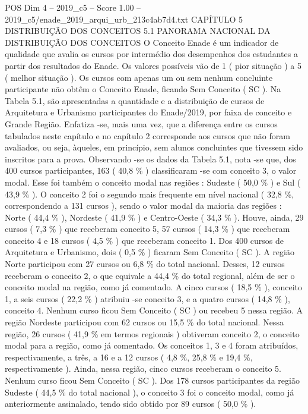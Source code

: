\begin{textsample}{POS Dim 4 – 2019\_c5 – Score 1.00 – 2019\_c5/enade\_2019\_arqui\_urb\_213c4ab7d4.txt}  \label{ex:f4_pos_192}
CAPÍTULO 5 DISTRIBUIÇÃO DOS CONCEITOS 5.1 PANORAMA NACIONAL DA DISTRIBUIÇÃO DOS CONCEITOS O Conceito Enade é um indicador de qualidade que avalia os cursos por intermédio dos desempenhos dos estudantes a partir dos resultados do Enade.
Os valores possíveis vão de 1 ( pior situação ) a 5 ( melhor situação ).
Os cursos com apenas um ou sem nenhum concluinte participante não obtêm o Conceito Enade, ficando Sem Conceito ( SC ).
Na Tabela 5.1, são apresentadas a quantidade e a distribuição de cursos de Arquitetura e Urbanismo participantes do Enade/2019, por faixa de conceito e Grande Região.
Enfatiza -se, mais uma vez, que a diferença entre os cursos tabulados neste capítulo e no capítulo 2 corresponde aos cursos que não foram avaliados, ou seja, àqueles, em princípio, sem alunos concluintes que tivessem sido inscritos para a prova.
Observando -se os dados da Tabela 5.1, nota -se que, dos 400 cursos participantes, 163 ( 40,8 \% ) classificaram -se com conceito 3, o valor modal.
Esse foi também o conceito modal nas regiões : Sudeste ( 50,0 \% ) e Sul ( 43,9 \% ).
O conceito 2 foi o segundo mais frequente em nível nacional ( 32,8 \%, correspondendo a 131 cursos ), sendo o valor modal da maioria das regiões : Norte ( 44,4 \% ), Nordeste ( 41,9 \% ) e Centro-Oeste ( 34,3 \% ).
Houve, ainda, 29 cursos ( 7,3 \% ) que receberam conceito 5, 57 cursos ( 14,3 \% ) que receberam conceito 4 e 18 cursos ( 4,5 \% ) que receberam conceito 1.
Dos 400 cursos de Arquitetura e Urbanismo, dois ( 0,5 \% ) ficaram Sem Conceito ( SC ).
A região Norte participou com 27 cursos ou 6,8 \% do total nacional.
Desses, 12 cursos receberam o conceito 2, o que equivale a 44,4 \% do total regional, além de ser o conceito modal na região, como já comentado.
A cinco cursos ( 18,5 \% ), conceito 1, a seis cursos ( 22,2 \% ) atribuiu -se conceito 3, e a quatro cursos ( 14,8 \% ), conceito 4.
Nenhum curso ficou Sem Conceito ( SC ) ou recebeu 5 nessa região.
A região Nordeste participou com 62 cursos ou 15,5 \% do total nacional.
Nessa região, 26 cursos ( 41,9 \% em termos regionais ) obtiveram conceito 2, o conceito modal para a região, como já comentado.
Os conceitos 1, 3 e 4 foram atribuídos, respectivamente, a três, a 16 e a 12 cursos ( 4,8 \%, 25,8 \% e 19,4 \%, respectivamente ).
Ainda, nessa região, cinco cursos receberam o conceito 5.
Nenhum curso ficou Sem Conceito ( SC ).
Dos 178 cursos participantes da região Sudeste ( 44,5 \% do total nacional ), o conceito 3 foi o conceito modal, como já anteriormente assinalado, tendo sido obtido por 89 cursos ( 50,0 \% ).

\end{textsample}
